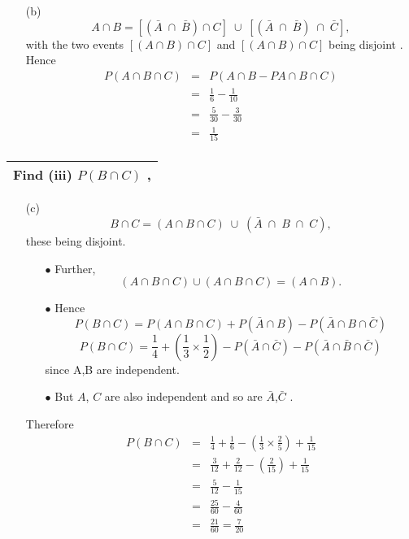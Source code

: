 \documentclass[a4paper,12pt]{article}
\begin{document}
\begin{itemize}
\item[(b)] \[A\cap B = [(\bar{A} \; \cap \; \bar{B})\cap C]\;\cup\;[(\bar{A} \;\cap\; \bar{B})\;\cap\; \bar{C}],\]
with the two events $[(A\cap B)\cap C]$ and $[(A\cap B)\cap C]$ being disjoint .
Hence 
\begin{eqnarray*}
P( A\cap B \cap C) &=& P (A\cap B - P A\cap B \cap C) \\ 
&=& \frac{1}{6} - \frac{1}{10}\\
&=& \frac{5}{30} - \frac{3}{30}\\
&=&  \frac{1}{15}\\
\end{eqnarray*}
\end{itemize}
\newpage
\begin{table}[ht!]
 \centering
 \begin{tabular}{|p{15cm}|}
 \hline
\noindent Find
(iii) $P(B \cap C)$ ,


\\ \hline
  \end{tabular}
\end{table}

\begin{itemize}
\item[(c)]  \[B\cap C = (A\cap B\cap C)\;\cup\;(\bar{A} \;\cap\; B \;\cap\; C), \] these being disjoint.
\begin{itemize}
\item[$\bullet$] Further, \[(A\cap B \cap C)\cup(A\cap B \cap C) = (A\cap B) .\]
\item[$\bullet$] Hence \[P(B \cap C) = P(A\cap B \cap C) + P(\bar{A} \cap B) - P(\bar{A} \cap B \cap \bar{C})\]
\[P(B \cap C) =  \frac{1}{4}+ \left( \frac{1}{3} \times \frac{1}{2} \right) 
- P (\bar{A} \cap \bar{C} ) - P (\bar{A} \cap \bar{B} \cap \bar{C}) \]
since A,B are independent.

\item[$\bullet$] But $A$, $C$ are also independent and so are $\bar{A}$,$\bar{C}$ .
\end{itemize}

Therefore 
\begin{eqnarray*}
P( B \cap C)  &=& \frac{1}{4} +\frac{1}{6} -\left( \frac{1}{3} \times \frac{2}{5} \right) + \frac{1}{15} \\
&=& \frac{3}{12} +\frac{2}{12} -\left(  \frac{2}{15} \right) + \frac{1}{15}
\\
&=& \frac{5}{12} -\frac{1}{15}\\
&=& \frac{25}{60} -\frac{4}{60}\\
&=& \frac{21}{60} = \frac{7}{20}\\
\end{eqnarray*}

\end{itemize}
\end{document}
